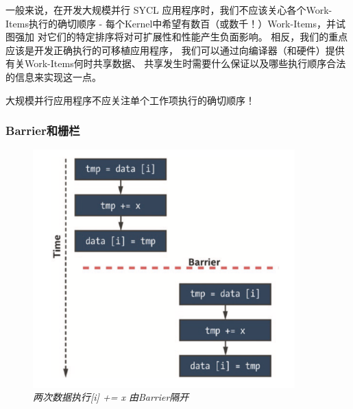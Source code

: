 一般来说，在开发大规模并行 SYCL 应用程序时，我们不应该关心各个Work-Items执行的确切顺序 
- 每个Kernel中希望有数百（或数千！）Work-Items，并试图强加 对它们的特定排序将对可扩展性和性能产生负面影响。 
相反，我们的重点应该是开发正确执行的可移植应用程序，
我们可以通过向编译器（和硬件）提供有关Work-Items何时共享数据、
共享发生时需要什么保证以及哪些执行顺序合法的信息来实现这一点。

\begin{remark}
	大规模并行应用程序不应关注单个工作项执行的确切顺序！
\end{remark}

\subsubsection{Barrier和栅栏}
\begin{figure}[H]
	\centering
	\includegraphics[width=0.9\textwidth]{figs/F19.5.png}
	\caption{\textit{两次数据执行[i] += x 由Barrier隔开 }}
\end{figure}

